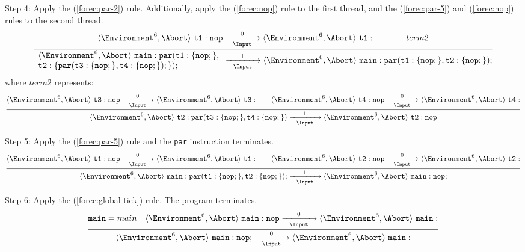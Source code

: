 \noindent
Step 4: Apply the (\ref{forec:par-2}) rule. Additionally, apply the 
(\ref{forec:nop}) rule to the first thread, and the (\ref{forec:par-5})
and (\ref{forec:nop}) rules to the second thread.
\begin{equation*}
	\frac{
			\langle \Environment^6, \Abort \rangle ~ \mathtt{t1: nop}
				\xrightarrow[~~\Input~~]{0} 
			\langle \Environment^6, \Abort \rangle ~ \mathtt{t1:}
			\qquad
			\qquad
			term2
		}{
			\begin{array}{l}
				\langle \Environment^6, \Abort \rangle ~ \mathtt{main: par(t1:\{nop;\},}	\\
				\mathtt{t2:\{par( t3:\{nop;\},t4:\{nop;\} );\} );}							\\
			\end{array}
				\xrightarrow[~~\Input~~]{\bot} 
			\langle \Environment^6, \Abort \rangle ~ \mathtt{main: par(t1:\{nop;\}, t2:\{nop;\} );}
		}
\end{equation*}
where $term2$ represents:
\begin{equation*}
	\frac{
			\langle \Environment^6, \Abort \rangle ~ \mathtt{t3:nop}
				\xrightarrow[~~\Input~~]{0} 
			\langle \Environment^6, \Abort \rangle ~ \mathtt{t3:}
			\qquad
			\langle \Environment^6, \Abort \rangle ~ \mathtt{t4:nop}
				\xrightarrow[~~\Input~~]{0} 
			\langle \Environment^6, \Abort \rangle ~ \mathtt{t4:}
		}{
			\langle \Environment^6, \Abort \rangle ~ \mathtt{t2:par(t3:\{nop;\},t4:\{nop;\} )}
				\xrightarrow[~~\Input~~]{\bot} 
			\langle \Environment^6, \Abort \rangle ~ \mathtt{t2:nop}
		}
\end{equation*}

\noindent
Step 5: Apply the (\ref{forec:par-5}) rule and the \verb$par$
instruction terminates.
\begin{equation*}
	\frac{
			\langle \Environment^6, \Abort \rangle ~ \mathtt{t1: nop}
				\xrightarrow[~~\Input~~]{0} 
			\langle \Environment^6, \Abort \rangle ~ \mathtt{t1:}
			\qquad
			\langle \Environment^6, \Abort \rangle ~ \mathtt{t2: nop}
				\xrightarrow[~~\Input~~]{0} 
			\langle \Environment^6, \Abort \rangle ~ \mathtt{t2:}
		}{
			\langle \Environment^6, \Abort \rangle ~ \mathtt{main: par(t1:\{nop;\}, t2:\{nop;\} );}
				\xrightarrow[~~\Input~~]{\bot} 
			\langle \Environment^6, \Abort \rangle ~ \mathtt{main: nop;}
		}
\end{equation*}

\noindent
Step 6: Apply the (\ref{forec:global-tick}) rule.
The program terminates.
\begin{equation*}
	\frac{
			\mathtt{main} = main
			\quad
			\langle \Environment^6, \Abort \rangle ~ \mathtt{main: nop}
				\xrightarrow[~~\Input~~]{0} 
			\langle \Environment^6, \Abort \rangle ~ \mathtt{main: }
		}{
			\langle \Environment^6, \Abort \rangle ~ \mathtt{main: nop;}
				\xrightarrow[~~\Input~~]{0} 
			\langle \Environment^6, \Abort \rangle ~ \mathtt{main: }
		}
\end{equation*}
